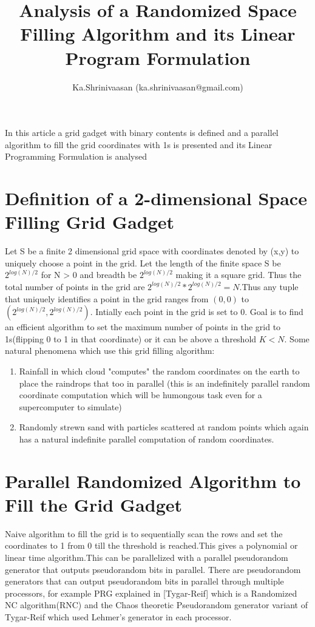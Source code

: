 \documentclass[11pt,onecolumn]{article}
\author{ Ka.Shrinivaasan (ka.shrinivaasan@gmail.com) }
\title{Analysis of a Randomized Space Filling Algorithm and its Linear Program Formulation}
\begin{document}
\thispagestyle{empty}
\pagestyle{empty}
\maketitle
\begin{onecolabstract}
In this article a grid gadget with binary contents is defined and a parallel algorithm to fill the grid coordinates with 1s is presented and its Linear Programming Formulation is analysed 
\end{onecolabstract}

\section{Definition of a 2-dimensional Space Filling Grid Gadget}
Let S be a finite 2 dimensional grid space with coordinates denoted by (x,y) to uniquely choose a point in the grid. Let the length of the finite space S be $2^{log(N)/2}$ for N > 0 and breadth be $2^{log(N)/2}$ making it a square grid. Thus the total number of points in the grid are $2^{log(N)/2} * 2^{log(N)/2} = N$.Thus any tuple that uniquely identifies a point in the grid ranges from $(0,0)$ to $(2^{log(N)/2}, 2^{log(N)/2})$. Intially each point in the grid is set to 0. Goal is to find an efficient algorithm to set the maximum number of points in the grid to 1s(flipping 0 to 1 in that coordinate) or it can be above a threshold $K < N$. Some natural phenomena which use this grid filling algorithm:
\begin{enumerate}
\item Rainfall in which cloud "computes" the random coordinates on the earth to place the raindrops that too in parallel (this is an indefinitely parallel random coordinate computation which will be humongous task even for a supercomputer to simulate)
\item Randomly strewn sand with particles scattered at random points which again has a natural indefinite parallel computation of random coordinates.
\end{enumerate}

\section{Parallel Randomized Algorithm to Fill the Grid Gadget}
Naive algorithm to fill the grid is to sequentially scan the rows and set the coordinates to 1 from 0 till the threshold is reached.This gives a polynomial or linear time algorithm.This can be parallelized with a parallel pseudorandom generator that outputs pseudorandom bits in parallel. There are pseudorandom generators that can output pseudorandom bits in parallel through multiple processors, for example PRG explained in [Tygar-Reif] which is a Randomized NC algorithm(RNC) and the Chaos theoretic Pseudorandom generator variant of Tygar-Reif which used Lehmer's generator in each processor.
\end{document}
